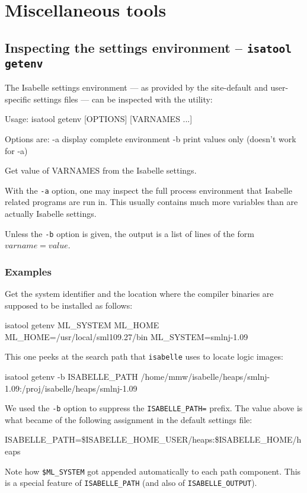 

\chapter{Miscellaneous tools}


\section{Inspecting the settings environment -- \texttt{isatool getenv}}
\label{sec:tool-getenv}

The Isabelle settings environment --- as provided by the site-default
and user-specific settings files --- can be inspected with the
 utility:
\begin{ttbox}
Usage: isatool getenv [OPTIONS] [VARNAMES ...]

  Options are:
    -a           display complete environment
    -b           print values only (doesn't work for -a)

  Get value of VARNAMES from the Isabelle settings.
\end{ttbox}

With the \texttt{-a} option, one may inspect the full process
environment that Isabelle related programs are run in. This usually
contains much more variables than are actually Isabelle settings.

Unless the \texttt{-b} option is given, the output is a list of lines
of the form $varname\mathtt{=}value$.


\subsection*{Examples}

Get the {\ML} system identifier and the location where the compiler
binaries are supposed to be installed as follows:
\begin{ttbox}
isatool getenv ML_SYSTEM ML_HOME
{\out ML_HOME=/usr/local/sml109.27/bin}
{\out ML_SYSTEM=smlnj-1.09}
\end{ttbox}

This one peeks at the search path that \texttt{isabelle} uses to
locate logic images:
\begin{ttbox}
isatool getenv -b ISABELLE_PATH
{\out /home/mmw/isabelle/heaps/smlnj-1.09:/proj/isabelle/heaps/smlnj-1.09}
\end{ttbox}
We used the \texttt{-b} option to suppress the \texttt{ISABELLE_PATH=}
prefix.  The value above is what became of the following assignment in
the default settings file:
\begin{ttbox}
ISABELLE_PATH=\$ISABELLE_HOME_USER/heaps:\$ISABELLE_HOME/heaps
\end{ttbox}
Note how \texttt{\$ML_SYSTEM} got appended automatically to each path
component. This is a special feature of \texttt{ISABELLE_PATH} (and
also of \texttt{ISABELLE_OUTPUT}).

